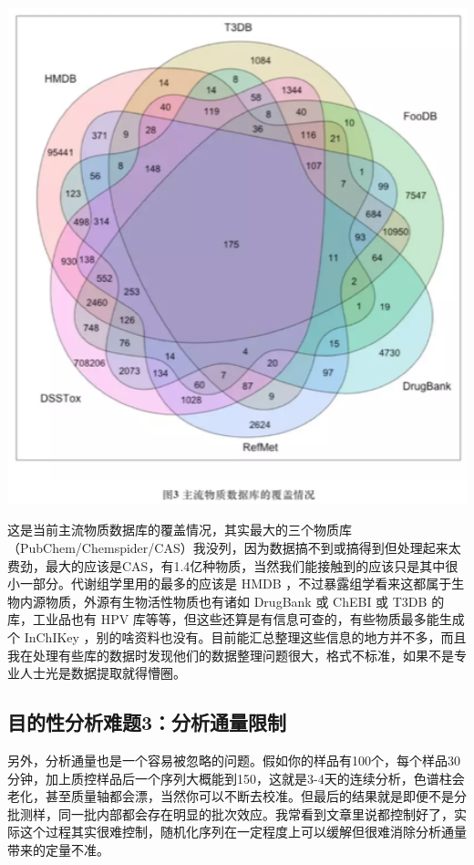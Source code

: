 \documentclass[]{book}
\begin{document}
\includegraphics[width=6.17in]{images/expo3}

这是当前主流物质数据库的覆盖情况，其实最大的三个物质库（PubChem/Chemspider/CAS）我没列，因为数据搞不到或搞得到但处理起来太费劲，最大的应该是CAS，有1.4亿种物质，当然我们能接触到的应该只是其中很小一部分。代谢组学里用的最多的应该是 HMDB ，不过暴露组学看来这都属于生物内源物质，外源有生物活性物质也有诸如 DrugBank 或 ChEBI 或 T3DB 的库，工业品也有 HPV 库等等，但这些还算是有信息可查的，有些物质最多能生成个 InChIKey ，别的啥资料也没有。目前能汇总整理这些信息的地方并不多，而且我在处理有些库的数据时发现他们的数据整理问题很大，格式不标准，如果不是专业人士光是数据提取就得懵圈。

\hypertarget{ux76eeux7684ux6027ux5206ux6790ux96beux98983ux5206ux6790ux901aux91cfux9650ux5236}{%
\subsection{目的性分析难题3：分析通量限制}\label{ux76eeux7684ux6027ux5206ux6790ux96beux98983ux5206ux6790ux901aux91cfux9650ux5236}}

另外，分析通量也是一个容易被忽略的问题。假如你的样品有100个，每个样品30分钟，加上质控样品后一个序列大概能到150，这就是3-4天的连续分析，色谱柱会老化，甚至质量轴都会漂，当然你可以不断去校准。但最后的结果就是即便不是分批测样，同一批内部都会存在明显的批次效应。我常看到文章里说都控制好了，实际这个过程其实很难控制，随机化序列在一定程度上可以缓解但很难消除分析通量带来的定量不准。
\end{document}
